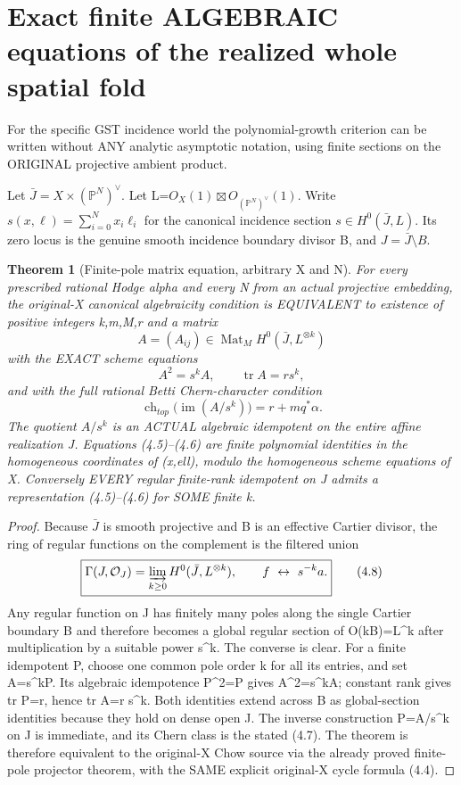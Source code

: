 \documentclass[11pt]{article}
\newtheorem{theorem}{Theorem}[section]
\begin{document}
\section{Exact finite ALGEBRAIC equations of the realized whole spatial fold}
For the specific GST incidence world the
polynomial-growth criterion can be written
without ANY analytic asymptotic notation,
using finite sections on the ORIGINAL
projective ambient product.

Let $\bar J=X\times(\mathbb P^N)^\vee$.
Let L=$O_X(1)\boxtimes O_{(\mathbb P^N)^\vee}(1)$.
Write $s(x,\ell)=\sum_{i=0}^N x_i\ell_i$
for the canonical incidence section
$s\in H^0(\bar J,L)$.
Its zero locus is the genuine smooth
incidence boundary divisor B, and
$J=\bar J\setminus B$.

\begin{theorem}[Finite-pole matrix equation, arbitrary X and N]
For every prescribed rational Hodge alpha
and every N from an actual projective embedding,
the original-X canonical algebraicity
condition is EQUIVALENT to existence of
positive integers k,m,M,r and a matrix
\[
 \boxed{
 A=(A_{ij})\in
 \operatorname{Mat}_M H^0(\bar J,L^{\otimes k})
 }                                                        \tag{4.5}
\]
with the EXACT scheme equations
\[
 \boxed{
 A^2=s^k A,\qquad
 \operatorname{tr} A=r s^k,
 }                                                        \tag{4.6}
\]
and with the full rational Betti
Chern-character condition
\[
 \boxed{
 \operatorname{ch}_{top}
   \bigl(\operatorname{im}(A/s^k)\bigr)
      =r+m q^*\alpha.
 }                                                        \tag{4.7}
\]
The quotient $A/s^k$ is an ACTUAL
algebraic idempotent on the entire
affine realization J. Equations
(4.5)--(4.6) are finite polynomial
identities in the homogeneous
coordinates of (x,ell), modulo the
homogeneous scheme equations of X.
Conversely EVERY regular finite-rank
idempotent on J admits a representation
(4.5)--(4.6) for SOME finite k.
\end{theorem}
\begin{proof}
Because $\bar J$ is smooth projective
and B is an effective Cartier divisor,
the ring of regular functions on the
complement is the filtered union
\[
 \boxed{
 \Gamma(J,\mathcal O_J)
   =\varinjlim_{k\ge0}
     H^0(\bar J,L^{\otimes k}),
 \qquad f\ \leftrightarrow\ s^{-k}a.
 }                                                        \tag{4.8}
\]
Any regular function on J has finitely
many poles along the single Cartier
boundary B and therefore becomes a
global regular section of O(kB)=L^k
after multiplication by a suitable
power s^k. The converse is clear.
For a finite idempotent P, choose one
common pole order k for all its
entries, and set A=s^kP. Its algebraic
idempotence P^2=P gives A^2=s^kA;
constant rank gives tr P=r,
hence tr A=r s^k.
Both identities extend across B as
global-section identities because
they hold on dense open J.
The inverse construction P=A/s^k
on J is immediate, and its Chern
class is the stated (4.7).
The theorem is therefore equivalent
to the original-X Chow source via
the already proved finite-pole
projector theorem, with the SAME
explicit original-X cycle formula
(4.4).
\end{proof}
\end{document}
